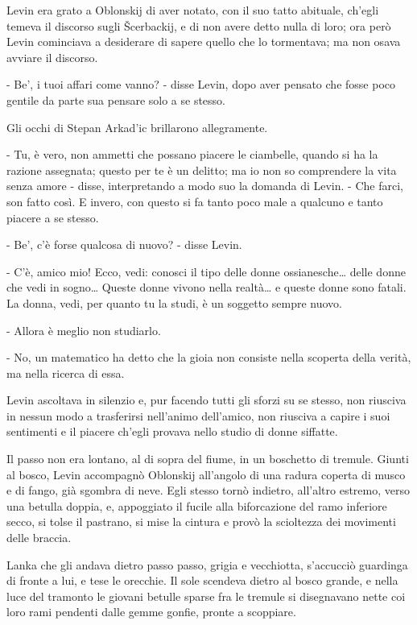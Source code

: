 Levin era grato a Oblonskij di aver notato, con il suo tatto abituale, ch'egli temeva il discorso sugli Šcerbackij, e di non avere detto nulla di loro; ora però Levin cominciava a desiderare di sapere quello che lo tormentava; ma non osava avviare il discorso. 

- Be', i tuoi affari come vanno? - disse Levin, dopo aver pensato che fosse poco gentile da parte sua pensare solo a se stesso. 

Gli occhi di Stepan Arkad'ic brillarono allegramente. 

- Tu, è vero, non ammetti che possano piacere le ciambelle, quando si ha la razione assegnata; questo per te è un delitto; ma io non so comprendere la vita senza amore - disse, interpretando a modo suo la domanda di Levin. - Che farci, son fatto così. E invero, con questo si fa tanto poco male a qualcuno e tanto piacere a se stesso. 

- Be', c'è forse qualcosa di nuovo? - disse Levin. 

- C'è, amico mio! Ecco, vedi: conosci il tipo delle donne ossianesche\ldots{} delle donne che vedi in sogno\ldots{} Queste donne vivono nella realtà\ldots{} e queste donne sono fatali. La donna, vedi, per quanto tu la studi, è un soggetto sempre nuovo. 

- Allora è meglio non studiarlo. 

- No, un matematico ha detto che la gioia non consiste nella scoperta della verità, ma nella ricerca di essa. 

Levin ascoltava in silenzio e, pur facendo tutti gli sforzi su se stesso, non riusciva in nessun modo a trasferirsi nell'animo dell'amico, non riusciva a capire i suoi sentimenti e il piacere ch'egli provava nello studio di donne siffatte. 

\label{xv-1} 

Il passo non era lontano, al di sopra del fiume, in un boschetto di tremule. Giunti al bosco, Levin accompagnò Oblonskij all'angolo di una radura coperta di musco e di fango, già sgombra di neve. Egli stesso tornò indietro, all'altro estremo, verso una betulla doppia, e, appoggiato il fucile alla biforcazione del ramo inferiore secco, si tolse il pastrano, si mise la cintura e provò la scioltezza dei movimenti delle braccia. 

Lanka che gli andava dietro passo passo, grigia e vecchiotta, s'accucciò guardinga di fronte a lui, e tese le orecchie. Il sole scendeva dietro al bosco grande, e nella luce del tramonto le giovani betulle sparse fra le tremule si disegnavano nette coi loro rami pendenti dalle gemme gonfie, pronte a scoppiare. 

